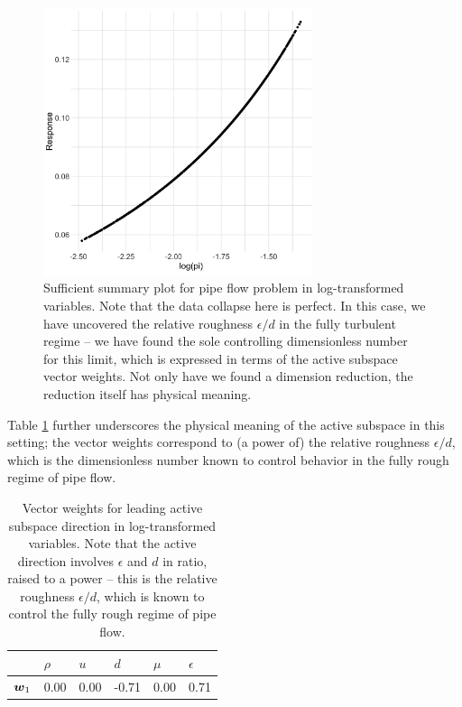 \documentclass{article}
\begin{document}
\begin{figure}
  \centering
  \includegraphics[width=0.7\textwidth]{../../images/as_summary_pi}
  \caption{Sufficient summary plot for pipe flow problem in log-transformed
    variables. Note that the data collapse here is perfect. In this case, we
    have uncovered the relative roughness $\epsilon/d$ in the fully turbulent
    regime -- we have found the sole controlling dimensionless number for this
    limit, which is expressed in terms of the active subspace vector weights.
    Not only have we found a dimension reduction, the reduction itself has
    physical meaning.}
  \label{fig:pipe-summary-pi}
\end{figure}

Table \ref{tab:pipe-as-pi} further underscores the physical meaning of the
active subspace in this setting; the vector weights correspond to (a power of)
the relative roughness $\epsilon/d$, which is the dimensionless number known to
control behavior in the fully rough regime of pipe flow.

\begin{table}[!ht]
  \centering
  \begin{tabular}{@{}llllll@{}}
            & $\rho$ & $u$  & $d$   & $\mu$ & $\epsilon$ \\
    \midrule
    $\boldsymbol{w}_1$ & 0.00   & 0.00 & -0.71 & 0.00  & 0.71
  \end{tabular}
  \caption{Vector weights for leading active subspace direction in
    log-transformed variables. Note that the active direction involves
    $\epsilon$ and $d$ in ratio, raised to a power -- this is the relative
    roughness $\epsilon/d$, which is known to control the fully rough regime of
    pipe flow.}
  \label{tab:pipe-as-pi}
\end{table}
\end{document}
